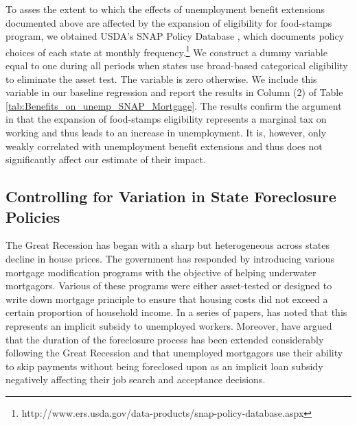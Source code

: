 \documentclass[12pt]{article}
\newcommand{\1}{\mathbf{1}}
\begin{document}
\begin{appendix}
To asses the extent to which the effects of unemployment benefit extensions documented above are affected by the expansion of eligibility for food-stamps program, we obtained USDA's SNAP Policy Database \citep{data:usda-snap-policy}, which documents policy choices of each state at monthly frequency.\footnote{http://www.ers.usda.gov/data-products/snap-policy-database.aspx} We construct a dummy variable equal to one during all periods when states use broad-based categorical eligibility to eliminate the asset test. The variable is zero otherwise. We include this variable in our baseline regression and report the results in Column (2) of Table \ref{tab:Benefits_on_unemp_SNAP_Mortgage}. The results confirm the argument in \citet{mulligan:12} that the expansion of food-stamps eligibility represents a marginal tax on working and thus leads to an increase in unemployment. It is, however, only weakly correlated with unemployment benefit extensions and thus does not significantly affect our estimate of their impact.



\begin{table}[t]
\centering
   \caption{Controlling for State SNAP and Foreclosure Policies }\label{tab:Benefits_on_unemp_SNAP_Mortgage}
\small

\vspace{-0.2cm}
\end{table}


\subsection{Controlling for Variation in State Foreclosure Policies}

The Great Recession has began with a sharp but heterogeneous across states decline in house prices. The government has responded by introducing various mortgage modification programs with the objective of helping underwater mortgagors. Various of these programs were either asset-tested or designed to write down mortgage principle to ensure that housing costs did not exceed a certain proportion of household income. In a series of papers, \citet{mulligan:08, mulligan:09, mulligan:10} has noted that this represents an implicit subsidy to unemployed workers. Moreover, \citet{herkenhoff+ohanian:13} have argued that the duration of the foreclosure process has been extended considerably following the Great Recession and that unemployed mortgagors use their ability to skip payments without being foreclosed upon as an implicit loan subsidy negatively affecting their job search and acceptance decisions.



\end{appendix}
\end{document}

